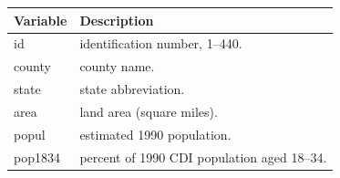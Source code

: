 \documentclass[]{article}
\begin{document}
\begin{longtable}[]{@{}ll@{}}
\toprule
\begin{minipage}[b]{0.11\columnwidth}\raggedright\strut
Variable\strut
\end{minipage} & \begin{minipage}[b]{0.84\columnwidth}\raggedright\strut
Description\strut
\end{minipage}\tabularnewline
\midrule
\endhead
\begin{minipage}[t]{0.11\columnwidth}\raggedright\strut
id\strut
\end{minipage} & \begin{minipage}[t]{0.84\columnwidth}\raggedright\strut
identification number, 1--440.\strut
\end{minipage}\tabularnewline
\begin{minipage}[t]{0.11\columnwidth}\raggedright\strut
county\strut
\end{minipage} & \begin{minipage}[t]{0.84\columnwidth}\raggedright\strut
county name.\strut
\end{minipage}\tabularnewline
\begin{minipage}[t]{0.11\columnwidth}\raggedright\strut
state\strut
\end{minipage} & \begin{minipage}[t]{0.84\columnwidth}\raggedright\strut
state abbreviation.\strut
\end{minipage}\tabularnewline
\begin{minipage}[t]{0.11\columnwidth}\raggedright\strut
area\strut
\end{minipage} & \begin{minipage}[t]{0.84\columnwidth}\raggedright\strut
land area (square miles).\strut
\end{minipage}\tabularnewline
\begin{minipage}[t]{0.11\columnwidth}\raggedright\strut
popul\strut
\end{minipage} & \begin{minipage}[t]{0.84\columnwidth}\raggedright\strut
estimated 1990 population.\strut
\end{minipage}\tabularnewline
\begin{minipage}[t]{0.11\columnwidth}\raggedright\strut
pop1834\strut
\end{minipage} & \begin{minipage}[t]{0.84\columnwidth}\raggedright\strut
percent of 1990 CDI population aged 18--34.\strut
\end{minipage}\tabularnewline

\end{longtable}
\end{document}
